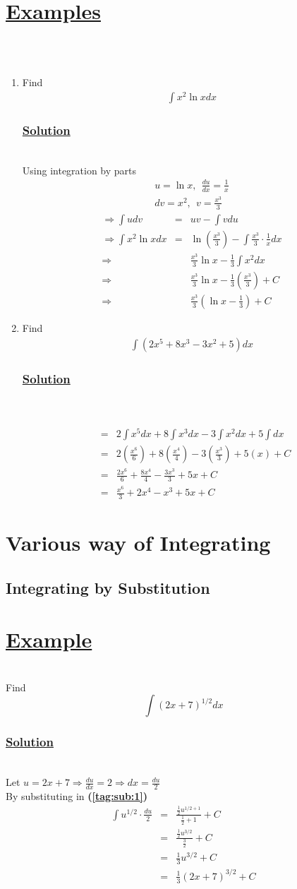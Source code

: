 \documentclass[12pt]{report}
\newcommand{\ubt}[1]{\textbf{\underline{#1}}}
\newcommand{\sps}{\\[0.2cm]}
\newcommand{\spn}[1]{\\[#1cm]}
\newcommand{\refn}[1]{\textbf{(\ref{#1})}}
\newcommand{\dsp}{\displaystyle}
\newcommand{\examples}{\section*{\ubt{Examples}}{~}\spn{-1}}
\newcommand{\solution}{\subsubsection{\ubt{Solution}}{~}\spn{-1}}
\newcommand{\eg}{\section*{\ubt{Example}}{~}\spn{-1}}
\begin{document}
	\examples{~}\\[-1.9cm]
	\begin{enumerate}
		\item 
			Find
			\begin{eqnarray*}
				\int x^2\ln x dx
			\end{eqnarray*}
			\solution
			Using integration by parts
			\begin{gather*}
				u=\ln x, ~~\frac{du}{dx} = \frac{1}{x}\sps
				dv = x^2,~~ v = \frac{x^3}{3}
			\end{gather*}
			\begin{eqnarray*}
				\Rightarrow \int u dv &=& uv - \int vdu\sps
				\Rightarrow \int x^2\ln x dx &=& 	\ln\left(\frac{x^3}{3}\right) - \int\frac{x^3}{3}\cdot \frac{1}{x}dx\sps
				\Rightarrow && \frac{x^3}{3}\ln x - \frac{1}{3}\int x^2 	dx\sps
				\Rightarrow && \frac{x^3}{3}\ln x - 	\frac{1}{3}\left(\frac{x^3}{3}\right) + C \sps
				\Rightarrow && \frac{x^3}{3}\left(\ln x - 	\frac{1}{3}\right) + C
			\end{eqnarray*}
	
		\item
			Find
			\begin{eqnarray*}
				\int (2x^5 + 8x^3 - 3x^2 + 5)dx
			\end{eqnarray*}
			\solution{~}\\[-1.7cm]
			\begin{eqnarray*}
				&=& 2\int x^5 dx + 8\int x^3dx - 3\int x^2 dx + 5\int dx\sps
				&=& 2\left(\frac{x^6}{6}\right)+ 8\left(\frac{x^4}{4}\right) - 3\left(\frac{x^3}{3}\right) + 5(x) + C\sps
				&=& \frac{2x^6}{6} + \frac{8x^4}{4} - \frac{3x^3}{3} + 5x + C\sps
				&=&\frac{x^6}{3} + 2x^4 - x^3 + 5x + C
			\end{eqnarray*}
	\end{enumerate}


	\section{Various way of Integrating}
	\subsection{Integrating by Substitution}
	\eg
	Find 
	\begin{equation}
		\int (2x + 7)^{1/2}dx\tag{1}\label{tag:sub:1}
	\end{equation}
	\solution
	Let $\dsp u=2x + 7 \Rightarrow \frac{du}{dx} = 2 \Rightarrow dx = \frac{du}{2}$ \sps
	By substituting in \refn{tag:sub:1}
	\begin{eqnarray*}
		\int u^{1/2} \cdot \frac{du}{2} &=& \frac{\frac{1}{2} u^{1/2 + 1}}{\frac{1}{2}+1} + C\sps
		&=& \frac{\frac{1}{2}u^{3/2}}{\frac{3}{2}} + C \sps
		&=& \frac{1}{3}u^{3/2} + C\sps
		&=& \frac{1}{3}\left(2x + 7\right)^{3/2} + C
	\end{eqnarray*}
	
\end{document}
